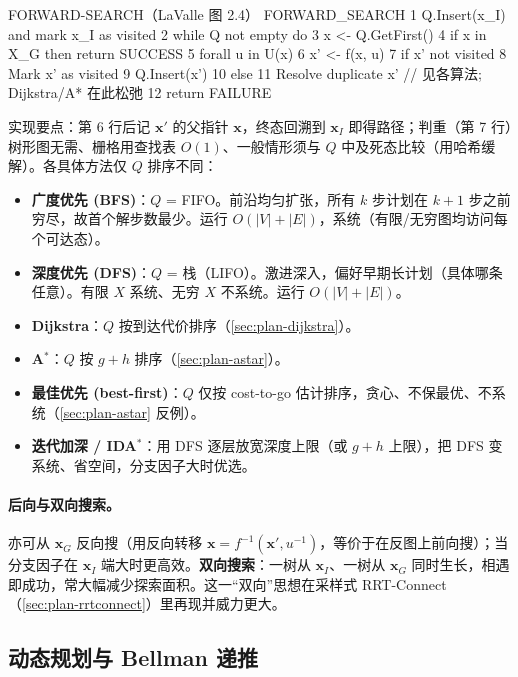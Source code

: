 \begin{codebox}[text]{FORWARD-SEARCH（LaValle 图 2.4）}
FORWARD_SEARCH
 1  Q.Insert(x_I) and mark x_I as visited
 2  while Q not empty do
 3      x <- Q.GetFirst()
 4      if x in X_G then return SUCCESS
 5      forall u in U(x)
 6          x' <- f(x, u)
 7          if x' not visited
 8              Mark x' as visited
 9              Q.Insert(x')
10          else
11              Resolve duplicate x'          // 见各算法; Dijkstra/A* 在此松弛
12  return FAILURE
\end{codebox}

\noindent 实现要点：第 6 行后记 $\mathbf{x}'$ 的父指针 $\mathbf{x}$，终态回溯到 $\mathbf{x}_I$ 即得路径；判重（第 7 行）树形图无需、栅格用查找表 $O(1)$、一般情形须与 $Q$ 中及死态比较（用哈希缓解）。各具体方法仅 $Q$ 排序不同：

\begin{itemize}
  \item \textbf{广度优先 (BFS)}：$Q$ = FIFO。前沿均匀扩张，所有 $k$ 步计划在 $k+1$ 步之前穷尽，故首个解步数最少。运行 $O(|V|+|E|)$，系统（有限/无穷图均访问每个可达态）。
  \item \textbf{深度优先 (DFS)}：$Q$ = 栈（LIFO）。激进深入，偏好早期长计划（具体哪条任意）。有限 $X$ 系统、无穷 $X$ 不系统。运行 $O(|V|+|E|)$。
  \item \textbf{Dijkstra}：$Q$ 按到达代价排序（\cref{sec:plan-dijkstra}）。
  \item \textbf{A$^*$}：$Q$ 按 $g+h$ 排序（\cref{sec:plan-astar}）。
  \item \textbf{最佳优先 (best-first)}：$Q$ 仅按 cost-to-go 估计排序，贪心、不保最优、不系统（\cref{sec:plan-astar} 反例）。
  \item \textbf{迭代加深 / IDA$^*$}：用 DFS 逐层放宽深度上限（或 $g+h$ 上限），把 DFS 变系统、省空间，分支因子大时优选。
\end{itemize}

\paragraph{后向与双向搜索。}
亦可从 $\mathbf{x}_G$ 反向搜（用反向转移 $\mathbf{x}=f^{-1}(\mathbf{x}',u^{-1})$，等价于在反图上前向搜）；当分支因子在 $\mathbf{x}_I$ 端大时更高效。\textbf{双向搜索}：一树从 $\mathbf{x}_I$、一树从 $\mathbf{x}_G$ 同时生长，相遇即成功，常大幅减少探索面积。这一“双向”思想在采样式 RRT-Connect（\cref{sec:plan-rrtconnect}）里再现并威力更大。

\subsection{动态规划与 Bellman 递推}
\label{sec:plan-dp}

